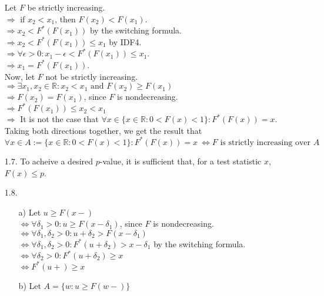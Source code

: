 \documentclass[11pt]{article}
\newcommand{\R}{\mathbb{R}}
\theoremstyle{definition}
\begin{document}
\begin{itemize}
        Let $F$ be strictly increasing. \\
        \( \Rightarrow\) if \(x_2<x_1\), then \(F(x_2)<F(x_1)\).\\
        \( \Rightarrow x_2<F^*(F(x_1)) \) by the switching formula. \\
        \( \Rightarrow x_2<F^*(F(x_1))\leq x_1 \) by IDF4. \\
        \( \Rightarrow \forall \epsilon>0: x_1-\epsilon<F^*(F(x_1))\leq x_1 \). \\
        \( \Rightarrow x_1 = F^*(F(x_1)) \). \\
        Now, let $F$ not be strictly increasing. \\
        \( \Rightarrow \exists x_1,x_2 \in \R: x_2<x_1 \mbox{ and } F(x_2)\geq F(x_1) \) \\
        \( \Rightarrow F(x_2)= F(x_1) \), since $F$ is nondecreasing. \\
        \( \Rightarrow F^*(F(x_1))\leq x_2 < x_1 \) \\
        \( \Rightarrow \) It is not the case that \(\forall x\in\{x\in\R:0<F(x)<1\}: F^*(F(x))=x\). \\
        Taking both directions together, we get the result that
        \[ \forall x\in A:=\{x\in\R:0<F(x)<1\}: F^*(F(x))=x\ \Leftrightarrow F \mbox{ is strictly increasing over } A \]
    \item[1.7.]
        To acheive a desired $p$-value, it is sufficient that, for a test statistic $x$, \(F(x)\leq p\).
    \item[1.8.]
        \begin{itemize}
            \item[a)]
                Let \(u\geq F(x-)\) \\
                \( \Leftrightarrow \forall \delta_1>0: u\geq F(x-\delta_1) \), since $F$ is nondecreasing. \\
                \( \Leftrightarrow \forall \delta_1,\delta_2>0: u + \delta_2 > F(x-\delta_1) \) \\
                \( \Leftrightarrow \forall \delta_1,\delta_2>0: F^*(u + \delta_2) > x-\delta_1 \) by the switching formula. \\
                \( \Leftrightarrow \forall \delta_2>0: F^*(u + \delta_2) \geq x \) \\
                \( \Leftrightarrow F^*(u+) \geq x \) \\
            \item[b)]
                Let \(A = \{w:u\geq F(w-)\}\) \\

\end{itemize}
\end{itemize}
\end{document}
